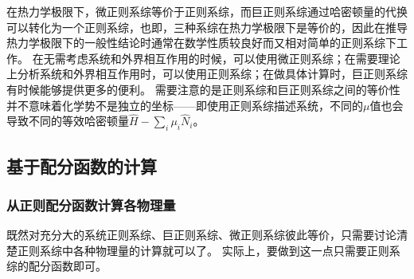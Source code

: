 \documentclass[hyperref, UTF8, a4paper]{ctexart}
\begin{document}
在热力学极限下，微正则系综等价于正则系综，而巨正则系综通过哈密顿量的代换可以转化为一个正则系综，也即，三种系综在热力学极限下是等价的，因此在推导热力学极限下的一般性结论时通常在数学性质较良好而又相对简单的正则系综下工作。
在无需考虑系统和外界相互作用的时候，可以使用微正则系综；在需要理论上分析系统和外界相互作用时，可以使用正则系综；在做具体计算时，巨正则系综有时候能够提供更多的便利。
需要注意的是正则系综和巨正则系综之间的等价性并不意味着化学势不是独立的坐标——即使用正则系综描述系统，不同的$\mu$值也会导致不同的等效哈密顿量$\hat{H}-\sum_i \mu_i \hat{N}_i$。

\subsection{基于配分函数的计算}

\subsubsection{从正则配分函数计算各物理量}\label{sec:calculation-from-canonical-partition}

既然对充分大的系统正则系综、巨正则系综、微正则系综彼此等价，只需要讨论清楚正则系综中各种物理量的计算就可以了。
实际上，要做到这一点只需要正则系综的配分函数即可。
\end{document}

